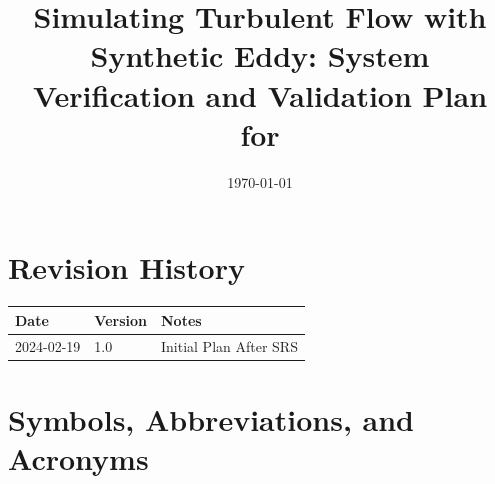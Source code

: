 \documentclass[12pt, titlepage]{article}
\begin{document}
\title{Simulating Turbulent Flow with Synthetic Eddy: System Verification and Validation Plan for \progname{}}
\author{\authname}
\date{\today}
	
\maketitle


\section*{Revision History}

\begin{tabularx}{\textwidth}{p{3cm}p{2cm}X}
\toprule {\bf Date} & {\bf Version} & {\bf Notes}\\
\midrule
2024-02-19 & 1.0 & Initial Plan After SRS\\
\bottomrule
\end{tabularx}



\newpage

\tableofcontents

\listoftables

\listoffigures

\newpage

\section{Symbols, Abbreviations, and Acronyms}
\end{document}
